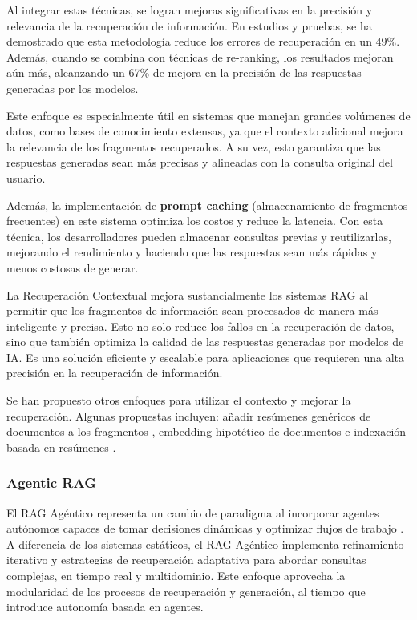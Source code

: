 Al integrar estas técnicas, se logran mejoras significativas en la precisión y relevancia de la recuperación de información. 
En estudios y pruebas, se ha demostrado que esta metodología reduce los errores de recuperación en un 49\%. 
Además, cuando se combina con técnicas de re-ranking, los resultados mejoran aún más, alcanzando un 67\% de mejora en la precisión de las respuestas generadas por los modelos.

Este enfoque es especialmente útil en sistemas que manejan grandes volúmenes de datos, como bases de conocimiento extensas, ya que el contexto adicional mejora la relevancia de los fragmentos recuperados. 
A su vez, esto garantiza que las respuestas generadas sean más precisas y alineadas con la consulta original del usuario.

Además, la implementación de \textbf{prompt caching} (almacenamiento de fragmentos frecuentes) en este sistema optimiza los costos y reduce la latencia. 
Con esta técnica, los desarrolladores pueden almacenar consultas previas y reutilizarlas, mejorando el rendimiento y haciendo que las respuestas sean más rápidas y menos costosas de generar.

La Recuperación Contextual mejora sustancialmente los sistemas RAG al permitir que los fragmentos de información sean procesados de manera más inteligente y precisa. 
Esto no solo reduce los fallos en la recuperación de datos, sino que también optimiza la calidad de las respuestas generadas por modelos de IA. 
Es una solución eficiente y escalable para aplicaciones que requieren una alta precisión en la recuperación de información.

Se han propuesto otros enfoques para utilizar el contexto y mejorar la recuperación. 
Algunas propuestas incluyen: añadir resúmenes genéricos de documentos a los fragmentos \cite{10.3115/1118162.1118167}, embedding hipotético de documentos \cite{gao2022precisezeroshotdenseretrieval} e indexación basada en resúmenes \cite{LlamaIndex2024}.

\subsubsection{Agentic RAG}

El RAG Agéntico representa un cambio de paradigma al incorporar agentes autónomos capaces de tomar decisiones dinámicas y optimizar flujos de trabajo \cite{singh2025agenticretrievalaugmentedgenerationsurvey}. 
A diferencia de los sistemas estáticos, el RAG Agéntico implementa refinamiento iterativo y estrategias de recuperación adaptativa para abordar consultas complejas, en tiempo real y multidominio. 
Este enfoque aprovecha la modularidad de los procesos de recuperación y generación, al tiempo que introduce autonomía basada en agentes.

